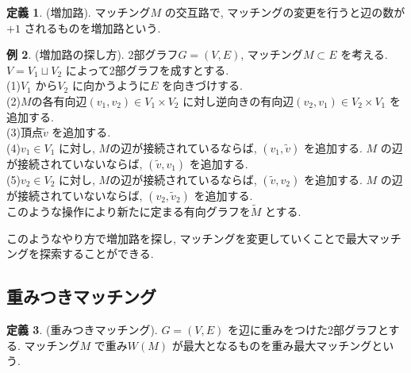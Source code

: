 \documentclass[10pt, fleqn, label-section=none]{bxjsarticle}
\theoremstyle{definition}
\newtheorem{dfn}{定義}[section]
\newtheorem{ex}[dfn]{例}
\renewcommand{\;}{\, ; \,}
\newenvironment{claim}[1]{\par\noindent\underline{claim:}\space#1}{}
\newenvironment{claimproof}[1]{\par\noindent{($\because$)}\space#1}{\hfill $\blacktriangle $}
\begin{document}
\begin{dfn}(増加路). 
マッチング$M$ の交互路で, マッチングの変更を行うと辺の数が$+1$ されるものを増加路という. 
\end{dfn}

\begin{ex}(増加路の探し方). 2部グラフ$G = (V, E)$, マッチング$M \subset E$ を考える. $V = V_1 \sqcup V_2$ によって2部グラフを成すとする. \\
(1)$V_1$ から$V_2$ に向かうように$E$ を向きづけする. \\
(2)$M$の各有向辺$(v_1, v_2) \in V_1 \times V_2$ に対し逆向きの有向辺$(v_2, v_1) \in V_2 \times V_1$ を追加する. \\
(3)頂点$\tilde v$ を追加する. \\
(4)$v_1 \in V_1$ に対し, $M$の辺が接続されているならば, $(v_1, \tilde v)$ を追加する. $M$ の辺が接続されていないならば, $(\tilde v, v_1)$ を追加する.  \\
(5)$v_2 \in V_2$ に対し, $M$の辺が接続されているならば, $(\tilde v, v_2)$ を追加する. $M$ の辺が接続されていないならば, $(v_2, \tilde v_2)$ を追加する.  \\
このような操作により新たに定まる有向グラフを$\tilde M $ とする. 


このようなやり方で増加路を探し, マッチングを変更していくことで最大マッチングを探索することができる. 
\end{ex}


\subsection{重みつきマッチング}

\begin{dfn}(重みつきマッチング). $G = (V,E)$ を辺に重みをつけた2部グラフとする. マッチング$M$ で重み$W(M)$ が最大となるものを重み最大マッチングという. 

\end{dfn}
\end{document}
